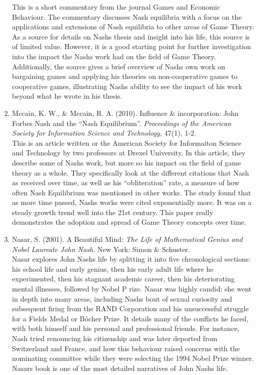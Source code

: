 \documentclass[11pt]{article}
\begin{document}
\begin{enumerate}
This is a short commentary from the journal Games and Economic Behaviour. The commentary discusses Nash equilibria with a focus on the applications and extensions of Nash equilibria to other areas of Game Theory. As a source for details on Nash\textsc{}s thesis and insight into his life, this source is of limited value. However, it is a good starting point for further investigation into the impact the Nash\textsc{}s work had on the field of Game Theory. Additionally, the source gives a brief overview of Nash\textsc{}s own work on bargaining games and applying his theories on non-cooperative games to cooperative games, illustrating Nash\textsc{}s ability to see the impact of his work beyond what he wrote in his thesis.\\

\item Mccain, K. W., \& Mccain, R. A. (2010). Influence \& incorporation: John Forbes Nash and the “Nash Equilibrium”. \textit{Proceedings of the American Society for Information Science and Technology}, 47(1), 1-2.\\

This is an article written or the American Society for Informaiton Science and Technology by two professors at Drexel University. In this article, they describe some of Nash\textsc{}s work, but more so his impact on the field of game theory as a whole. They specifically look at the different citations that Nash as received over time, as well as his “obliteration” rate, a measure of how often Nash Equilibrium was mentioned in other works. The study found that as more time passed, Nash\textsc{}s works were cited exponentially more. It was on a steady growth trend well into the 21st century. This paper really demonstrates the adoption and spread of Game Theory concepts over time.\\ 

\item Nasar, S. (2001). A Beautiful Mind: \textit{The Life of Mathematical Genius and Nobel Laureate John Nash}. New York: Simon \& Schuster.\\

Nasar explores John Nash\textsc{}s life by splitting it into five chronological sections: his school life and early genius, then his early adult life where he experimented, then his stagnant academic career, then his deteriorating mental illnesses, followed by Nobel P
rize.  Nasar was highly candid: she went in depth into many areas, including Nash\textsc{}s bout of sexual curiosity and subsequent firing from the RAND Corporation and his unsuccessful struggle for a Fields Medal or Bôcher Prize. It details many of the conflicts he 
faced, with both himself and his personal and professional
 friends. For instance, Nash tried renouncing his citizenship and was later deported from Switzerland and France, and how this behaviour raised concerns with the nominating committee while they were selecting the 1994 Nobel Prize winner. Nasar\textsc{}s book is one of the most detailed narratives of John Nash\textsc{}s life.\\ 
 

\end{enumerate}
\end{document}
